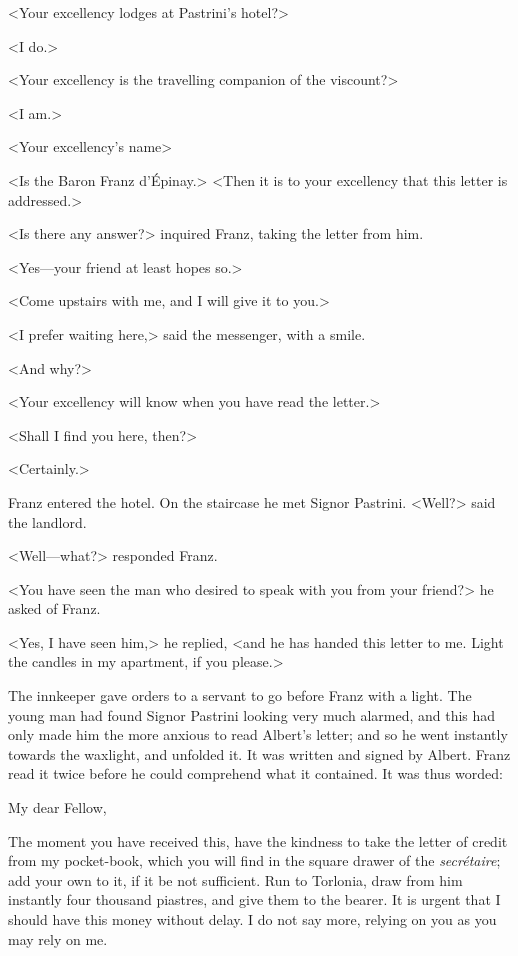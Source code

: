  <Your excellency lodges at Pastrini's hotel?> 

 <I do.> 

 <Your excellency is the travelling companion of the viscount?> 

 <I am.> 

 <Your excellency's name\longdash> 

 <Is the Baron Franz d'Épinay.>  <Then it is to your excellency that this letter is addressed.> 

 <Is there any answer?> inquired Franz, taking the letter from him. 

 <Yes—your friend at least hopes so.> 

 <Come upstairs with me, and I will give it to you.> 

 <I prefer waiting here,> said the messenger, with a smile. 

 <And why?> 

 <Your excellency will know when you have read the letter.> 

 <Shall I find you here, then?> 

 <Certainly.> 

 Franz entered the hotel. On the staircase he met Signor Pastrini. <Well?> said the landlord. 

 <Well—what?> responded Franz. 

 <You have seen the man who desired to speak with you from your friend?> he asked of Franz. 

 <Yes, I have seen him,> he replied, <and he has handed this letter to me. Light the candles in my apartment, if you please.> 

 The innkeeper gave orders to a servant to go before Franz with a light. The young man had found Signor Pastrini looking very much alarmed, and this had only made him the more anxious to read Albert's letter; and so he went instantly towards the waxlight, and unfolded it. It was written and signed by Albert. Franz read it twice before he could comprehend what it contained. It was thus worded: 

\begin{mail}{}{My dear Fellow,}

The moment you have received this, have the kindness to take the letter of credit from my pocket-book, which you will find in the square drawer of the \textit{secrétaire}; add your own to it, if it be not sufficient. Run to Torlonia, draw from him instantly four thousand piastres, and give them to the bearer. It is urgent that I should have this money without delay. I do not say more, relying on you as you may rely on me. 

\end{mail}

